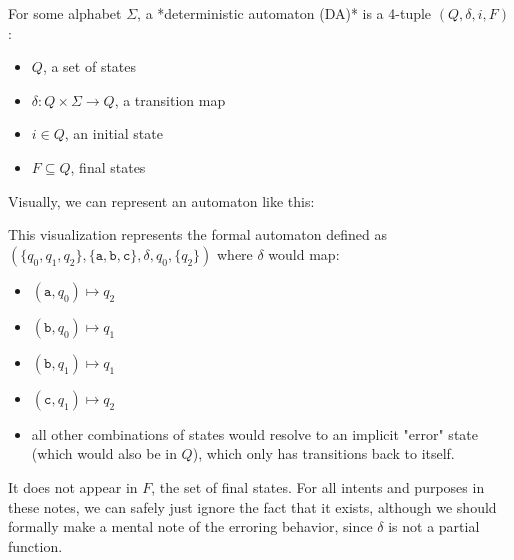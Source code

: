 \begin{definition}
  For some alphabet $\Sigma$, a *deterministic automaton (DA)* is a 4-tuple $(Q, \delta, i, F)$:
  \begin{itemize}
    \item $Q$, a set of states
    \item $\delta : Q \times \Sigma \rightarrow Q$, a transition map
    \item $i \in Q$, an initial state
    \item $F \subseteq Q$, final states
  \end{itemize}
\end{definition}

Visually, we can represent an automaton like this:

\begin{figure}[h]
\centering
{}
\end{figure}

This visualization represents the formal automaton defined as $(\{q_0, q_1, q_2\}, \{\mathtt{a}, \mathtt{b}, \mathtt{c}\}, \delta, q_0, \{q_2\})$ where $\delta$ would map:

\begin{itemize}
    \item $(\mathtt{a}, q_0) \mapsto q_2$
    \item $(\mathtt{b}, q_0) \mapsto q_1$
    \item $(\mathtt{b}, q_1) \mapsto q_1$
    \item $(\mathtt{c}, q_1) \mapsto q_2$
    \item all other combinations of states would resolve to an implicit "error" state (which would also be in $Q$), which only has transitions back to itself.
\end{itemize}

  It does not appear in $F$, the set of final states.
  For all intents and purposes in these notes, we can safely just ignore the fact that it exists, although we should formally make a mental note of the erroring behavior, since $\delta$ is not a partial function.

